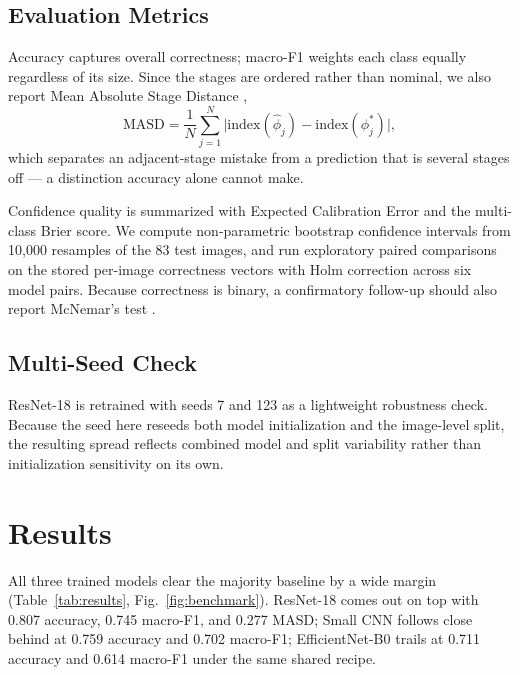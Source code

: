 \documentclass{llncs}
\begin{document}
\subsection{Evaluation Metrics}

Accuracy captures overall correctness; macro-F1 weights each class equally regardless of its size. Since the stages are ordered rather than nominal, we also report Mean Absolute Stage Distance \cite{gutierrez2016ordinal},
\begin{equation}
\mathrm{MASD} = \frac{1}{N}\sum_{j=1}^{N} \bigl| \mathrm{index}(\hat{\phi}_j) - \mathrm{index}(\phi_j^*) \bigr|,
\label{eq:masd}
\end{equation}
which separates an adjacent-stage mistake from a prediction that is several stages off — a distinction accuracy alone cannot make.

Confidence quality is summarized with Expected Calibration Error and the multi-class Brier score. We compute non-parametric bootstrap confidence intervals \cite{efron1993bootstrap} from 10,000 resamples of the 83 test images, and run exploratory paired comparisons on the stored per-image correctness vectors with Holm correction \cite{holm1979sequential} across six model pairs. Because correctness is binary, a confirmatory follow-up should also report McNemar's test \cite{mcnemar1947note}.

\subsection{Multi-Seed Check}

ResNet-18 is retrained with seeds 7 and 123 as a lightweight robustness check. Because the seed here reseeds both model initialization and the image-level split, the resulting spread reflects combined model and split variability rather than initialization sensitivity on its own.

\section{Results}

All three trained models clear the majority baseline by a wide margin (Table~\ref{tab:results}, Fig.~\ref{fig:benchmark}). ResNet-18 comes out on top with 0.807 accuracy, 0.745 macro-F1, and 0.277 MASD; Small CNN follows close behind at 0.759 accuracy and 0.702 macro-F1; EfficientNet-B0 trails at 0.711 accuracy and 0.614 macro-F1 under the same shared recipe.
\end{document}
